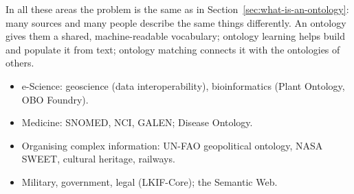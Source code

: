 \begin{nbwhy}
In all these areas the problem is the same as in Section~\ref{sec:what-is-an-ontology}:
many sources and many people describe the same things differently. An ontology gives
them a shared, machine-readable vocabulary; ontology learning helps build and populate
it from text; ontology matching connects it with the ontologies of others.
\end{nbwhy}

\begin{nbsummary}[applications]
\begin{itemize}[nosep]
  \item e-Science: geoscience (data interoperability), bioinformatics (Plant Ontology,
        OBO Foundry).
  \item Medicine: SNOMED, NCI, GALEN; Disease Ontology.
  \item Organising complex information: UN-FAO geopolitical ontology, NASA SWEET,
        cultural heritage, railways.
  \item Military, government, legal (LKIF-Core); the Semantic Web.
\end{itemize}
\end{nbsummary}

